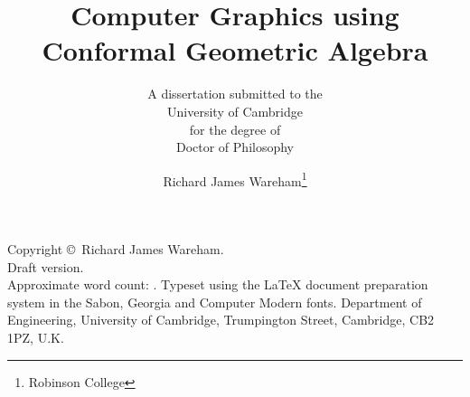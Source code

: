 \documentclass[a4paper,oneside,12pt,sabonnumbers]{RJWThesis}
\begin{document}
\begin{frontmatter}
\renewcommand{\baselinestretch}{1.2}\selectfont
\title{Computer Graphics using Conformal Geometric Algebra}
\subtitle{A dissertation submitted to the\\{\sc University of 
    Cambridge}\\for the degree of\\{\sc Doctor of Philosophy}}
\author{Richard James Wareham\thanks{Robinson College}}
\maketitle
\cleardoublepage

\vspace*{0.2\textheight}
\noindent Copyright \copyright \number\year\ Richard James Wareham.
\vspace*{1em}\\
\noindent Draft version.\\
\noindent Approximate word count: .
\vfill
\noindent Typeset using the \LaTeX{} document preparation system
in the Sabon, Georgia and Computer Modern fonts.
\vfill
{}\newline
Department of Engineering,\newline
University of Cambridge,\newline
Trumpington Street,\newline
Cambridge, CB2 1PZ, U.K.
\cleardoublepage

\dedication{Dedication}

\tableofcontents
\end{frontmatter}

\begin{mainmatter}
\renewcommand{\baselinestretch}{2.0}\selectfont









\end{mainmatter}


\begin{backmatter}

\end{backmatter}
\end{document}
